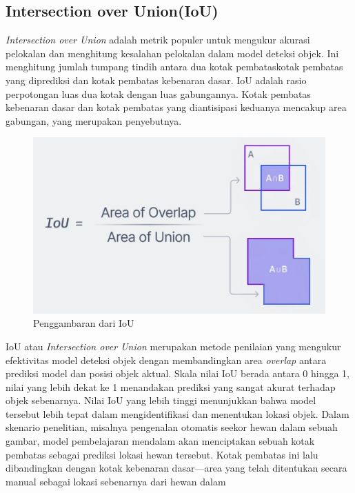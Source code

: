 \subsection{Intersection over Union(IoU)}
\emph{Intersection over Union} adalah metrik populer untuk mengukur akurasi pelokalan dan menghitung kesalahan pelokalan dalam model deteksi objek. Ini menghitung jumlah tumpang tindih antara dua kotak pembataskotak pembatas yang diprediksi dan kotak pembatas kebenaran dasar. IoU adalah rasio perpotongan luas dua kotak dengan luas gabungannya. Kotak pembatas kebenaran dasar dan kotak pembatas yang diantisipasi keduanya mencakup area gabungan, yang merupakan penyebutnya.
\begin{figure} [H] \centering
  \includegraphics[scale=0.6]{gambar/IoU.jpg}
  \caption{Penggambaran dari IoU }
  \label{fig:Intersection over Union }
\end{figure}
IoU atau \emph{Intersection over Union} merupakan metode penilaian yang mengukur efektivitas model deteksi objek dengan membandingkan area \emph{overlap} antara prediksi model dan posisi
objek aktual. Skala nilai IoU berada antara 0 hingga 1, nilai yang lebih dekat ke 1 menandakan prediksi yang sangat akurat terhadap objek sebenarnya. Nilai IoU yang lebih tinggi menunjukkan bahwa model tersebut lebih tepat dalam mengidentifikasi dan menentukan lokasi objek. Dalam skenario penelitian, misalnya pengenalan otomatis seekor hewan dalam sebuah gambar, model pembelajaran mendalam akan menciptakan sebuah kotak pembatas sebagai
prediksi lokasi hewan tersebut. Kotak pembatas ini lalu dibandingkan dengan kotak kebenaran
dasar—area yang telah ditentukan secara manual sebagai lokasi sebenarnya dari hewan dalam
